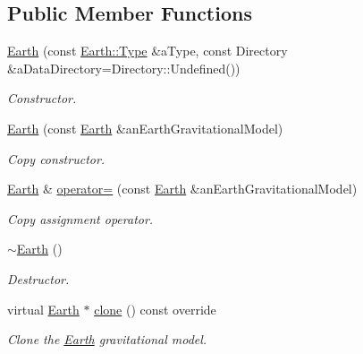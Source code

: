 \subsection*{Public Member Functions}
\begin{DoxyCompactItemize}
\item 
\hyperlink{classostk_1_1physics_1_1environment_1_1gravitational_1_1_earth_a2266b9103f680d49643a5a8b4739a323}{Earth} (const \hyperlink{classostk_1_1physics_1_1environment_1_1gravitational_1_1_earth_a9895df78b5c5aab5e981bf765f8c0f05}{Earth\+::\+Type} \&a\+Type, const Directory \&a\+Data\+Directory=Directory\+::\+Undefined())
\begin{DoxyCompactList}\small\item\em Constructor. \end{DoxyCompactList}\item 
\hyperlink{classostk_1_1physics_1_1environment_1_1gravitational_1_1_earth_a821f98411c65f59e6a297c6bcc3de291}{Earth} (const \hyperlink{classostk_1_1physics_1_1environment_1_1gravitational_1_1_earth}{Earth} \&an\+Earth\+Gravitational\+Model)
\begin{DoxyCompactList}\small\item\em Copy constructor. \end{DoxyCompactList}\item 
\hyperlink{classostk_1_1physics_1_1environment_1_1gravitational_1_1_earth}{Earth} \& \hyperlink{classostk_1_1physics_1_1environment_1_1gravitational_1_1_earth_accc913e0c0a5c7c8348c13217c5de4f3}{operator=} (const \hyperlink{classostk_1_1physics_1_1environment_1_1gravitational_1_1_earth}{Earth} \&an\+Earth\+Gravitational\+Model)
\begin{DoxyCompactList}\small\item\em Copy assignment operator. \end{DoxyCompactList}\item 
\hyperlink{classostk_1_1physics_1_1environment_1_1gravitational_1_1_earth_a0bd1037605f6fb37fb6babc7bb8ae745}{$\sim$\+Earth} ()
\begin{DoxyCompactList}\small\item\em Destructor. \end{DoxyCompactList}\item 
virtual \hyperlink{classostk_1_1physics_1_1environment_1_1gravitational_1_1_earth}{Earth} $\ast$ \hyperlink{classostk_1_1physics_1_1environment_1_1gravitational_1_1_earth_a987c2df62d8fedb368acf37e71ba7a47}{clone} () const override
\begin{DoxyCompactList}\small\item\em Clone the \hyperlink{classostk_1_1physics_1_1environment_1_1gravitational_1_1_earth}{Earth} gravitational model. \end{DoxyCompactList}\item 

\end{DoxyCompactItemize}
